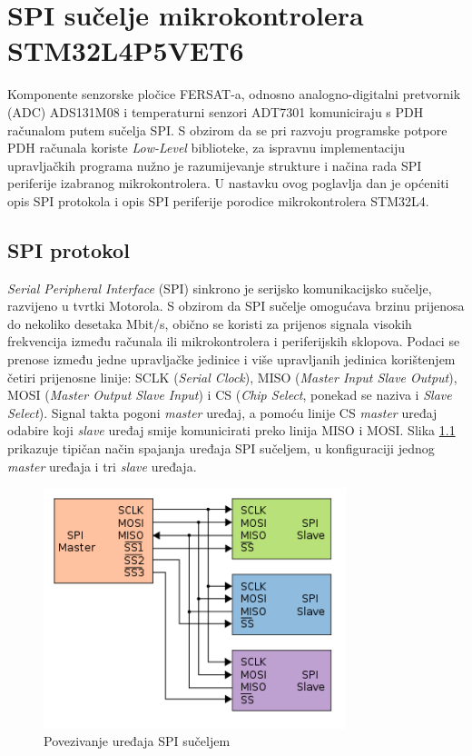 \chapter{SPI sučelje mikrokontrolera STM32L4P5VET6}
	Komponente senzorske pločice FERSAT-a, odnosno analogno-digitalni pretvornik (ADC) ADS131M08 i temperaturni senzori ADT7301 komuniciraju s PDH računalom putem sučelja SPI. S obzirom da se pri razvoju programske potpore PDH računala koriste \textit{Low-Level} biblioteke, za ispravnu implementaciju upravljačkih programa nužno je razumijevanje strukture i načina rada SPI periferije izabranog mikrokontrolera. U nastavku ovog poglavlja dan je općeniti opis SPI protokola i opis SPI periferije porodice mikrokontrolera STM32L4.
	
	\section{SPI protokol}
		\textit{Serial Peripheral Interface} (SPI) sinkrono je serijsko komunikacijsko sučelje, razvijeno u tvrtki Motorola. S obzirom da SPI sučelje omogućava brzinu prijenosa do nekoliko desetaka Mbit/s, obično se koristi za prijenos signala visokih frekvencija između računala ili mikrokontrolera i periferijskih sklopova. Podaci se prenose između jedne upravljačke jedinice  i više upravljanih jedinica  korištenjem četiri prijenosne linije: SCLK (\textit{Serial Clock}), MISO (\textit{Master Input Slave Output}), MOSI (\textit{Master Output Slave Input}) i CS (\textit{Chip Select}, ponekad se naziva i \textit{Slave Select}). Signal takta pogoni \textit{master} uređaj, a pomoću linije CS \textit{master} uređaj odabire koji \textit{slave} uređaj smije komunicirati preko linija MISO i MOSI. Slika \ref{fig:spi} prikazuje tipičan način spajanja uređaja SPI sučeljem, u konfiguraciji jednog \textit{master} uređaja i tri \textit{slave} uređaja.
		
		\begin{figure}[htb]
			\centering
			\includegraphics[height=7cm]{slike/spi.png}
			\caption{Povezivanje uređaja SPI sučeljem \cite{spi_wikipedia}}
			\label{fig:spi}
		\end{figure}
	
